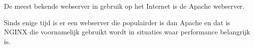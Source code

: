 De meest bekende webserver in gebruik op het Internet is de Apache webserver.

Sinds enige tijd is er een webserver die populairder is dan Apache en dat is NGINX die voornamelijk gebruikt wordt in situaties waar performance belangrijk is.
